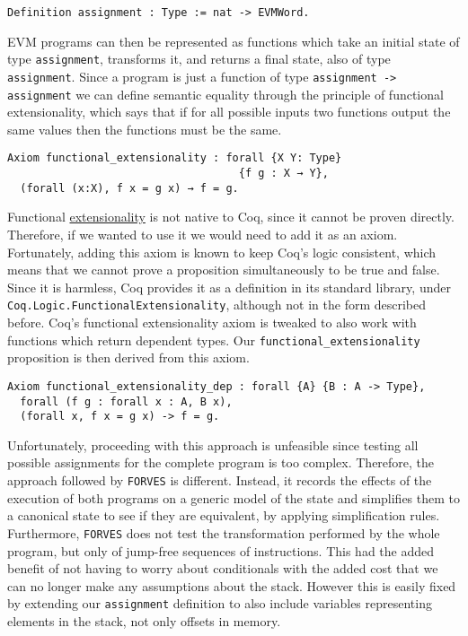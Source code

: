 \begin{verbatim}
Definition assignment : Type := nat -> EVMWord.
\end{verbatim}

EVM programs can then be represented as functions which take an initial state of type 
\texttt{assignment}, transforms it, and returns a final state, also of type
\texttt{assignment}. Since a program is just a function of type
\texttt{assignment -> assignment} we can define semantic equality through the principle of
functional extensionality, which says that if for all possible inputs two functions output the same
values then the functions must be the same.

\begin{verbatim}
Axiom functional_extensionality : forall {X Y: Type}
                                    {f g : X → Y},
  (forall (x:X), f x = g x) → f = g.
\end{verbatim}

Functional \href{}{extensionality} is not native to Coq, since it cannot be proven directly. Therefore, if we
wanted to use it we would need to add it as an axiom. Fortunately, adding this axiom is known to keep
Coq's logic consistent, which means that we cannot prove a proposition simultaneously to be true and 
false. Since it is harmless, Coq provides it as a definition in its standard library, under 
\texttt{Coq.Logic.FunctionalExtensionality}, although not in the form described before. Coq's functional
extensionality axiom is tweaked to also work with functions which return dependent types. Our 
\texttt{functional_extensionality} proposition is then derived from this axiom.

\begin{verbatim}
Axiom functional_extensionality_dep : forall {A} {B : A -> Type},
  forall (f g : forall x : A, B x),
  (forall x, f x = g x) -> f = g.
\end{verbatim}

Unfortunately, proceeding with this approach is unfeasible since testing all possible assignments for
the complete program is too complex. Therefore, the approach followed by \verb|FORVES| is different.
Instead, it records the effects of the execution of both programs on a generic model of the state and
simplifies them to a canonical state to see if they are equivalent, by applying simplification rules.
Furthermore, \verb|FORVES| does not test the transformation performed by the whole program, but only of 
jump-free sequences of instructions. This had the added benefit of not having to worry about 
conditionals with the added cost that we can no longer make any assumptions about the stack. However 
this is easily fixed by extending our \texttt{assignment} definition to also include 
variables representing elements in the stack, not only offsets in memory.

